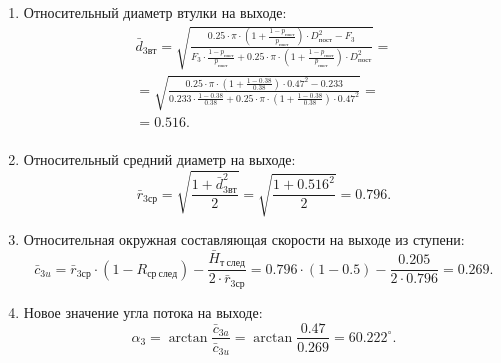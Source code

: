 \documentclass[a4paper,12pt]{article}
\begin{document}
\begin{enumerate}
\begin{enumerate}
            \item Относительный диаметр втулки на выходе:
            \begin{gather*}
                \bar{d}_{3вт} = \sqrt{ \frac{ 
                                0.25 \cdot \pi \cdot \left( 
                                    1 + \frac{ 1 - p_{пост} }{ p_{пост} } 
                                \right) \cdot D_{пост}^2 - F_3
                        }{ 
                            F_3 \cdot \frac{ 1 - p_{пост} }{ p_{пост} } + 0.25 \cdot \pi \cdot \left( 
                                    1 + \frac{ 1 - p_{пост} }{ p_{пост} } 
                                \right) \cdot D_{пост}^2
                    } } =\\ 
                =\sqrt{ \frac{ 
                                0.25 \cdot \pi \cdot \left( 
                                    1 + \frac{ 1 - 0.38 }{ 0.38 } 
                                \right) \cdot 0.47^2 - 0.233
                        }{ 
                            0.233 \cdot 
                            \frac{ 1 - 0.38 }{ 0.38 } 
                            + 0.25 \cdot \pi \cdot \left( 
                                    1 + \frac{ 1 - 0.38 }{ 0.38 } 
                            \right) \cdot 0.47^2
                    } } =\\ 
                = 0.516.\\
            \end{gather*}

            \item Относительный средний диаметр на выходе:
            \[
                \bar{r}_{3ср} = \sqrt{ \frac{ 1 + \bar{d}_{3вт}^2 }{ 2 } } = 
                \sqrt{ \frac{ 1 + 0.516 ^ 2 }{ 2 } } = 
                0.796.
            \]

            \item Относительная окружная составляющая скорости на выходе из ступени:
            \[
                \bar{c}_{3u} = \bar{r}_{3ср} \cdot (1 - R_{ср\ след}) - \frac{ \bar{H}_{т\ след} }{ 2 \cdot  \bar{r}_{3ср}} = 
                0.796 \cdot (1 - 0.5) -
                \frac{ 0.205 }{ 2 \cdot  0.796} =
                0.269. 
            \]

            \item Новое значение угла потока на выходе:
            \[
                \alpha_3 = \arctan{ \frac{ \bar{c}_{3a} }{ \bar{c}_{3u} } } = 
                \arctan{ \frac{ 0.47 }{ 0.269 } } = 
                60.222^\circ.
            \]


\end{enumerate}
\end{enumerate}
\end{document}
